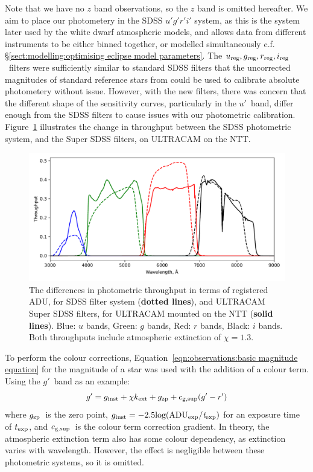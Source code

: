 Note that we have no $z$ band observations, so the $z$ band is omitted hereafter.
We aim to place our photometery in the SDSS $u'g'r'i'$ system, as this is the system later used by the white dwarf atmospheric models, and allows data from different instruments to be either binned together, or modelled simultaneously c.f. \S\ref{sect:modelling:optimising eclipse model parameters}. The $u_{\rm reg}, g_{\rm reg}, r_{\rm reg}, i_{\rm reg}$\ filters were sufficiently similar to standard SDSS filters that the uncorrected magnitudes of standard reference stars from \citet{smith2002} could be used to calibrate absolute photometery without issue. However, with the new filters, there was concern that the different shape of the sensitivity curves, particularly in the $u'$\ band, differ enough from the SDSS filters to cause issues with our photometric calibration. Figure~\ref{fig:sdss vs super filters} illustrates the change in throughput between the SDSS photometric system, and the Super SDSS filters, on ULTRACAM on the NTT.
\begin{figure}
    \centering
    \includegraphics[width=\columnwidth]{figures/observations/bandpass_diffs_SDSS_dots_UCAMNTT_solid.pdf}
    \caption{The differences in photometric throughput in terms of registered ADU, for SDSS filter system ({\bf dotted lines}), and ULTRACAM Super SDSS filters, for ULTRACAM mounted on the NTT ({\bf solid lines}). Blue: $u$ bands, Green: $g$ bands, Red: $r$ bands, Black: $i$ bands. Both throughputs include atmospheric extinction of $\chi = 1.3$.}
    \label{fig:sdss vs super filters}
\end{figure}

To perform the colour corrections, Equation~\ref{eqn:observations:basic magnitude equation} for the magnitude of a star was used with the addition of a colour term. Using the $g'$\ band as an example:
\begin{equation}
    \label{eqn:observations:magnitude with colour term}
    g' = g_{\rm inst} + \chi k_{\rm ext} + g_{\rm zp} + c_{\rm g, sup}(g'-r')
\end{equation}
where $g_{\rm zp}$\ is the zero point, $g_{\rm inst} = -2.5 \rm log(ADU_{\rm exp}/{\it t}_{\rm exp})$
for an exposure time of $t_{\rm exp}$, and $c_{\rm g, sup}$\ is the colour term correction gradient. In theory, the atmospheric extinction term also has some colour dependency, as extinction varies with wavelength. However, the effect is negligible between these photometric systems, so it is omitted.

